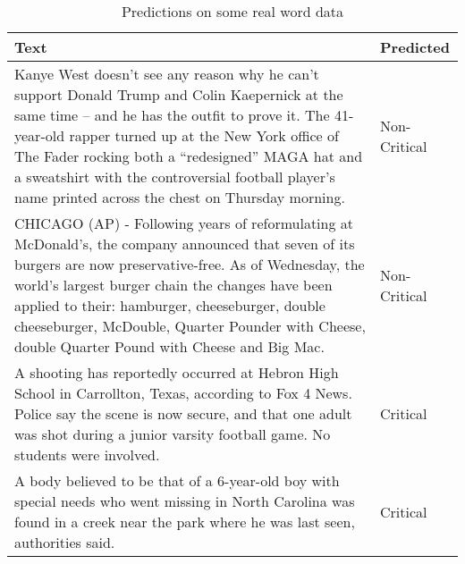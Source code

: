 \begin{table}
\begin{center}
\caption{Predictions on some real word data}
\label{tbl:real_prediction}
\begin{tabular}{p{12cm}p{2cm}}
\toprule 
Text&Predicted\\
\midrule 
Kanye West doesn’t see any reason why he can’t support Donald Trump and Colin Kaepernick at the same time – and he has the outfit to prove it.  The 41-year-old rapper turned up at the New York office of The Fader rocking both a “redesigned” MAGA hat and a sweatshirt with the controversial football player’s name printed across the chest on Thursday morning.&Non-Critical \\
\hline
CHICAGO (AP) - Following years of reformulating at McDonald's, the company announced that seven of its burgers are now preservative-free. As of Wednesday, the world's largest burger chain the changes have been applied to their: hamburger, cheeseburger, double cheeseburger, McDouble, Quarter Pounder with Cheese, double Quarter Pound with Cheese and Big Mac. &Non-Critical \\
\hline
A shooting has reportedly occurred at Hebron High School in Carrollton, Texas, according to Fox 4 News.  Police say the scene is now secure, and that one adult was shot during a junior varsity football game. No students were involved. &Critical \\
\hline
A body believed to be that of a 6-year-old boy with special needs who went missing in North Carolina was found in a creek near the park where he was last seen, authorities said.&Critical \\
\bottomrule
\end{tabular}
\end{center}
\end{table}